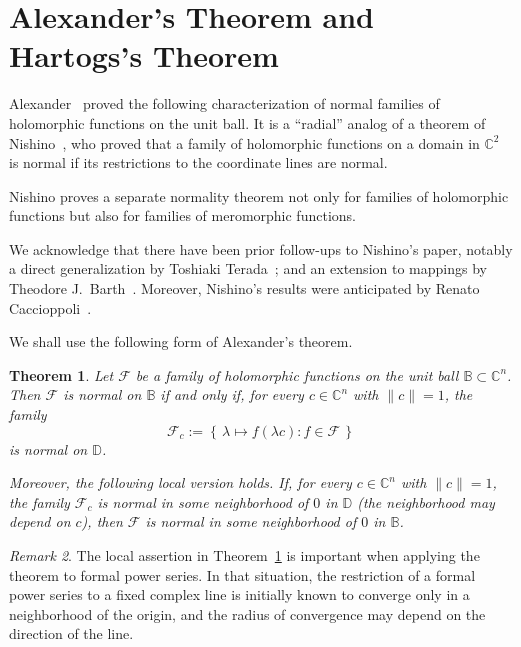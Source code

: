 \documentclass[pdflatex]{sn-jnl}%
\newtheorem{thm}{Theorem}[section]
\theoremstyle{definition}
\theoremstyle{remark}
\newtheorem{rem}[thm]{Remark}
\numberwithin{equation}{section}
\newcommand{\set}[1]{\left\{#1\right\}}
\newcommand{\C}{\mathbb{C}}
\newcommand{\Cn}{\mathbb{C}^n}
\newcommand{\D}{\mathbb{D}}
\begin{document}
    \section{Alexander's Theorem and Hartogs's Theorem}

    Alexander~\cite{MR0357850} proved the following characterization of normal families of holomorphic functions on the unit ball.
    It is a ``radial'' analog of a theorem of Nishino~\cite{MR0179384}, who proved that a family of holomorphic functions on a domain in $\C^2$ is normal if its restrictions to the coordinate lines are normal.

    Nishino proves a separate normality theorem not only for families of holomorphic functions but also for families of meromorphic functions.

    We acknowledge that there have been prior follow-ups to Nishino's paper, notably a direct generalization by Toshiaki Terada~\cite{MR0304698}; and an extension to mappings by Theodore J.~Barth~\cite{MR0374462}.
    Moreover, Nishino's results were anticipated by Renato Caccioppoli~\cite{zbMATH03012381}.

    We shall use the following form of Alexander's theorem.

    \begin{thm}
        \label{thm:alexander}
        Let $\mathcal{F}$ be a family of holomorphic functions on the unit ball $\mathbb{B}\subset\Cn$.
        Then $\mathcal{F}$ is normal on $\mathbb{B}$ if and only if, for every $c\in\C^n$ with $\lVert c\rVert=1$, the family
        \[
            \mathcal{F}_c := \set{\,\lambda\mapsto f(\lambda c):f\in\mathcal{F}\,}
        \]
        is normal on $\D$.

        Moreover, the following local version holds.
        If, for every $c\in\C^n$ with $\lVert c\rVert=1$, the family $\mathcal{F}_c$ is normal in some neighborhood of $0$ in $\D$ (the neighborhood may depend on $c$), then $\mathcal{F}$ is normal in some neighborhood of $0$ in $\mathbb{B}$.
    \end{thm}

    \begin{rem}
        \label{rem:alexander}
        The local assertion in Theorem~\ref{thm:alexander} is important when applying the theorem to formal power series.
        In that situation, the restriction of a formal power series to a fixed complex line is initially known to converge only in a neighborhood of the origin, and the radius of convergence may depend on the direction of the line.
    \end{rem}
\end{document}
